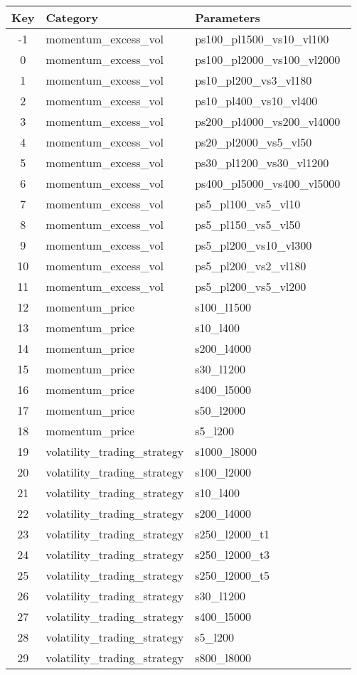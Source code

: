 \begin{tabular}{c|ll}

Key & Category & Parameters \\
\hline
-1 & momentum\_excess\_vol&ps100\_pl1500\_vs10\_vl100\ \\
0 & momentum\_excess\_vol&ps100\_pl2000\_vs100\_vl2000\ \\
1 & momentum\_excess\_vol&ps10\_pl200\_vs3\_vl180\ \\
2 & momentum\_excess\_vol&ps10\_pl400\_vs10\_vl400\ \\
3 & momentum\_excess\_vol&ps200\_pl4000\_vs200\_vl4000\ \\
4 & momentum\_excess\_vol&ps20\_pl2000\_vs5\_vl50\ \\
5 & momentum\_excess\_vol&ps30\_pl1200\_vs30\_vl1200\ \\
6 & momentum\_excess\_vol&ps400\_pl5000\_vs400\_vl5000\ \\
7 & momentum\_excess\_vol&ps5\_pl100\_vs5\_vl10\ \\
8 & momentum\_excess\_vol&ps5\_pl150\_vs5\_vl50\ \\
9 & momentum\_excess\_vol&ps5\_pl200\_vs10\_vl300\ \\
10 & momentum\_excess\_vol&ps5\_pl200\_vs2\_vl180\ \\
11 & momentum\_excess\_vol&ps5\_pl200\_vs5\_vl200\ \\
12 & momentum\_price&s100\_l1500\ \\
13 & momentum\_price&s10\_l400\ \\
14 & momentum\_price&s200\_l4000\ \\
15 & momentum\_price&s30\_l1200\ \\
16 & momentum\_price&s400\_l5000\ \\
17 & momentum\_price&s50\_l2000\ \\
18 & momentum\_price&s5\_l200\ \\
19 & volatility\_trading\_strategy&s1000\_l8000\ \\
20 & volatility\_trading\_strategy&s100\_l2000\ \\
21 & volatility\_trading\_strategy&s10\_l400\ \\
22 & volatility\_trading\_strategy&s200\_l4000\ \\
23 & volatility\_trading\_strategy&s250\_l2000\_t1\ \\
24 & volatility\_trading\_strategy&s250\_l2000\_t3\ \\
25 & volatility\_trading\_strategy&s250\_l2000\_t5\ \\
26 & volatility\_trading\_strategy&s30\_l1200\ \\
27 & volatility\_trading\_strategy&s400\_l5000\ \\
28 & volatility\_trading\_strategy&s5\_l200\ \\
29 & volatility\_trading\_strategy&s800\_l8000\ \\

\end{tabular}